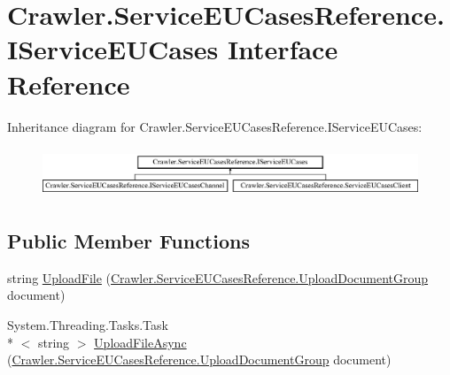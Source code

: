 \hypertarget{interface_crawler_1_1_service_e_u_cases_reference_1_1_i_service_e_u_cases}{\section{Crawler.\-Service\-E\-U\-Cases\-Reference.\-I\-Service\-E\-U\-Cases Interface Reference}
\label{interface_crawler_1_1_service_e_u_cases_reference_1_1_i_service_e_u_cases}
}
Inheritance diagram for Crawler.\-Service\-E\-U\-Cases\-Reference.\-I\-Service\-E\-U\-Cases\-:\begin{figure}[H]
\begin{center}
\leavevmode
\includegraphics[height=1.505376cm]{interface_crawler_1_1_service_e_u_cases_reference_1_1_i_service_e_u_cases}
\end{center}
\end{figure}
\subsection*{Public Member Functions}
\begin{DoxyCompactItemize}
\item 
string \hyperlink{interface_crawler_1_1_service_e_u_cases_reference_1_1_i_service_e_u_cases_a0e94f0da1a7b4b1005f5a8fa61d96e57}{Upload\-File} (\hyperlink{class_crawler_1_1_service_e_u_cases_reference_1_1_upload_document_group}{Crawler.\-Service\-E\-U\-Cases\-Reference.\-Upload\-Document\-Group} document)
\item 
System.\-Threading.\-Tasks.\-Task\\*
$<$ string $>$ \hyperlink{interface_crawler_1_1_service_e_u_cases_reference_1_1_i_service_e_u_cases_a33446aea294e4d28e81c59ca6f4dcaa1}{Upload\-File\-Async} (\hyperlink{class_crawler_1_1_service_e_u_cases_reference_1_1_upload_document_group}{Crawler.\-Service\-E\-U\-Cases\-Reference.\-Upload\-Document\-Group} document)
\end{DoxyCompactItemize}


